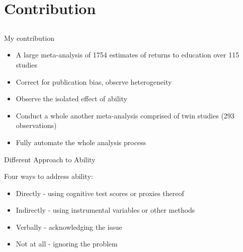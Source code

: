 \documentclass{beamer} %
\begin{document}
\section{Contribution}
\subsection{}

\begin{frame}{My contribution}

    \begin{itemize}
        \item<1-> A large meta-analysis of 1754 estimates of returns to education over 115 studies
        \item<2-> Correct for publication bias, observe heterogeneity
        \item<3-> Observe the isolated effect of ability
        \item<4-> Conduct a whole another meta-analysis comprised of twin studies (293 observations)
        \item<5-> Fully automate the whole analysis process
    \end{itemize}

\end{frame}




\begin{frame}{Different Approach to Ability}

    Four ways to address ability:
    \vspace{0.3cm}

    \begin{itemize}
        \item<1-> Directly - using cognitive test scores or proxies thereof
        \item<2-> Indirectly - using instrumental variables or other methods
        \item<3-> Verbally - acknowledging the issue
        \item<4-> Not at all - ignoring the problem
    \end{itemize}

\end{frame}
\end{document}
